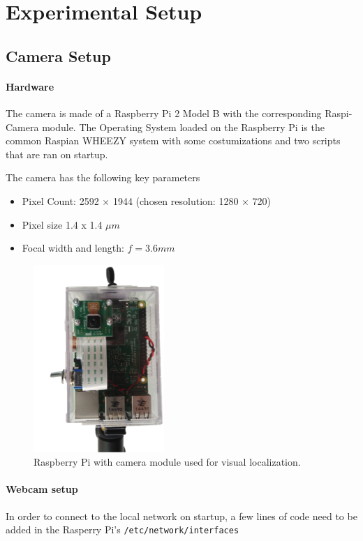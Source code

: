 \newpage
\section{Experimental Setup}

\subsection{Camera Setup}

\paragraph{Hardware} The camera is made of a Raspberry Pi 2 Model B with the corresponding Raspi-Camera module. 
The Operating System loaded on the Raspberry Pi is the common Raspian WHEEZY system with some costumizations and two scripts that are ran on startup. 

The camera has the following key parameters \cite{RaspiDoc}
\begin{itemize}
    \item Pixel Count: 2592 $\times$ 1944 (chosen resolution: 1280 $\times$ 720)
    \item Pixel size 1.4 x 1.4 $\mu m$
    \item Focal width and length: $f=3.6mm$
\end{itemize}

\begin{figure}[H]
    \centering
    \includegraphics[width=0.3\linewidth]{files/RaspiCam.png}
    \caption{Raspberry Pi with camera module used for visual localization.}
    \label{fig:camera}
\end{figure}


\paragraph{Webcam setup} In order to connect to the local network on startup, a few lines of code need to be added in the Rasperry Pi's \texttt{/etc/network/interfaces} 

